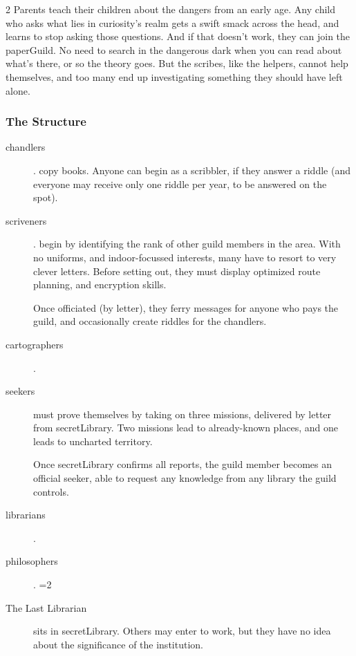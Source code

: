 \begin{multicols}{2}
Parents teach their children about the dangers from an early age.
Any child who asks what lies in curiosity's realm gets a swift smack across the head, and learns to stop asking those questions.
And if that doesn't work, they can join the \gls{paperGuild}.
No need to search in the dangerous dark when you can read about what's there, or so the theory goes.
But the scribes, like the helpers, cannot help themselves, and too many end up investigating something they should have left alone.

\subsubsection{The Structure}

\begin{description}
  \item[\Glspl{chandler}]
  .
  copy books.
  Anyone can begin as a scribbler, if they answer a riddle (and everyone may receive only one riddle per year, to be answered on the spot).
  \item[\Glspl{scrivener}]
  .
  \label{knowledgeWanderer}%
  begin by identifying the rank of other guild members in the area.
  With no uniforms, and indoor-focussed interests, many have to resort to very clever letters.
  Before setting out, they must display optimized route planning, and encryption skills.

  Once officiated (by letter), they ferry messages for anyone who pays the guild, and occasionally create riddles for the chandlers.
  \item[\Glspl{cartographer}]
  .
  \item[\Glspl{seeker}]
  must prove themselves by taking on three missions, delivered by letter from \gls{secretLibrary}.
  Two missions lead to already-known places, and one leads to uncharted territory.

  Once \gls{secretLibrary} confirms all reports, the guild member becomes an official \gls{seeker}, able to request any knowledge from any library the guild controls.
  \item[\Glspl{librarian}]
  .
  \item[\Glspl{philosopher}]
  .
  \ifnum\value{cycle}=2
    \item[The Last Librarian]
    sits in \gls{secretLibrary}.
    Others may enter to work, but they have no idea about the significance of the institution.


\end{description}
\end{multicols}
